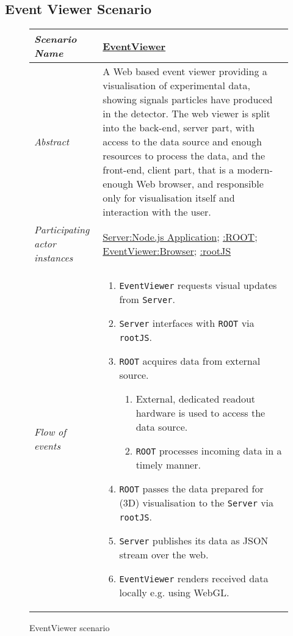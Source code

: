 \subsection{Event Viewer Scenario}
\begin{figure}[htb]
	\centering
	\begin{longtable}{p{3cm} @{\hskip 1cm} p{12cm}}
		\hline
		\textit{Scenario Name} & \underline{EventViewer}\\
		\hline
		\textit{Abstract} &
		A Web based event viewer providing a visualisation of experimental data, showing signals particles have produced in the detector.
		The web viewer is split into the back-end, server part, with access to
	    the data source and enough resources to process the data, and the front-end, client part, that is a modern-enough Web browser, and responsible only for visualisation itself and interaction with the user.
		\\
		\hline
		\textit{Participating actor instances} & 
		\underline{Server:Node.js Application}; \underline{:ROOT}; \underline{EventViewer:Browser}; \underline{:rootJS}\\
		\hline
		\textit{Flow of events} &
		\begin{enumerate}
			\item \texttt{EventViewer} requests visual updates from \texttt{Server}.
			\item \texttt{Server} interfaces with \texttt{ROOT} via \texttt{rootJS}.
			\item \texttt{ROOT} acquires data from external source.
			\begin{enumerate}
					\item External, dedicated readout hardware is used to access the data source.
					\item \texttt{ROOT} processes incoming data in a timely manner.
			\end{enumerate}
			\item \texttt{ROOT} passes the data prepared for (3D) visualisation to the \texttt{Server} via \texttt{rootJS}.
			\item \texttt{Server} publishes its data as JSON stream over the web.
			\item \texttt{EventViewer} renders received data locally e.g. using WebGL.
		\end{enumerate}
		\\
		\hline
	\end{longtable}
	\caption{EventViewer scenario}
\end{figure}